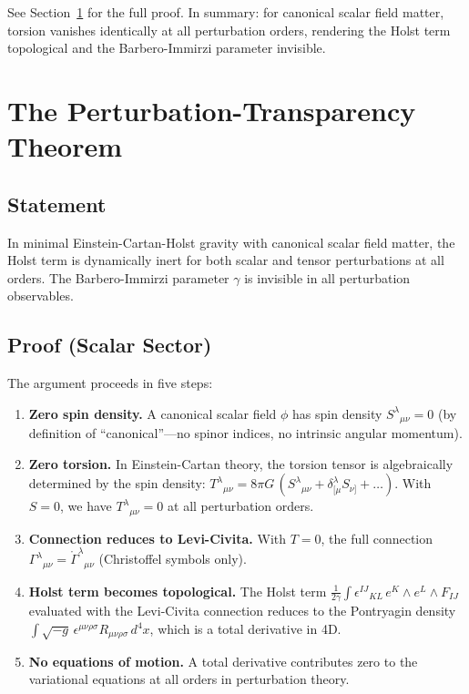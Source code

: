 \documentclass[a4paper,11pt]{article}
\begin{document}
See Section~\ref{sec:transparency} for the full proof. In summary: for canonical scalar field matter, torsion vanishes identically at all perturbation orders, rendering the Holst term topological and the Barbero-Immirzi parameter invisible.

\section{The Perturbation-Transparency Theorem}
\label{sec:transparency}

\subsection{Statement}

In minimal Einstein-Cartan-Holst gravity with canonical scalar field matter, the Holst term is dynamically inert for both scalar and tensor perturbations at all orders. The Barbero-Immirzi parameter $\gamma$ is invisible in all perturbation observables.

\subsection{Proof (Scalar Sector)}

The argument proceeds in five steps:

\begin{enumerate}
\item \textbf{Zero spin density.} A canonical scalar field $\phi$ has spin density $S^\lambda{}_{\mu\nu} = 0$ (by definition of ``canonical''---no spinor indices, no intrinsic angular momentum).

\item \textbf{Zero torsion.} In Einstein-Cartan theory, the torsion tensor is algebraically determined by the spin density: $T^\lambda{}_{\mu\nu} = 8\pi G\, (S^\lambda{}_{\mu\nu} + \delta^\lambda_{[\mu} S_{\nu]} + \ldots)$. With $S = 0$, we have $T^\lambda{}_{\mu\nu} = 0$ at all perturbation orders.

\item \textbf{Connection reduces to Levi-Civita.} With $T = 0$, the full connection $\Gamma^\lambda{}_{\mu\nu} = \mathring{\Gamma}^\lambda{}_{\mu\nu}$ (Christoffel symbols only).

\item \textbf{Holst term becomes topological.} The Holst term $\frac{1}{2\gamma}\int \epsilon^{IJ}{}_{KL}\, e^K \wedge e^L \wedge F_{IJ}$ evaluated with the Levi-Civita connection reduces to the Pontryagin density $\int \sqrt{-g}\, \epsilon^{\mu\nu\rho\sigma} R_{\mu\nu\rho\sigma}\, d^4x$, which is a total derivative in 4D.

\item \textbf{No equations of motion.} A total derivative contributes zero to the variational equations at all orders in perturbation theory.
\end{enumerate}
\end{document}
